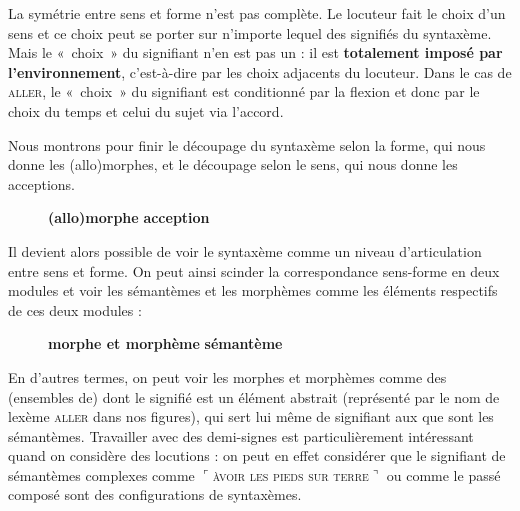 La symétrie entre sens et forme n’est pas complète. Le locuteur fait le choix d’un sens et ce choix peut se porter sur n’importe lequel des signifiés du syntaxème. Mais le «~choix~» du signifiant n’en est pas un : il est \textbf{totalement imposé par l’environnement}, c’est-à-dire par les choix adjacents du locuteur. Dans le cas de \textsc{aller}, le «~choix~» du signifiant est conditionné par la flexion et donc par le choix du temps et celui du sujet via l’accord.

Nous montrons pour finir le découpage du syntaxème selon la forme, qui nous donne les (allo)morphes, et le découpage selon le sens, qui nous donne les acceptions.

\begin{figure}

           \textbf{(allo)morphe}             \textbf{acception}

\caption{\label{fig:}}
\end{figure}

Il devient alors possible de voir le syntaxème comme un niveau d’articulation entre sens et forme. On peut ainsi scinder la correspondance sens-forme en deux modules et voir les sémantèmes et les morphèmes comme les éléments respectifs de ces deux modules :

\begin{figure}

    \textbf{morphe et morphème}         \textbf{sémantème}

\caption{\label{fig:}}
\end{figure}

En d’autres termes, on peut voir les morphes et morphèmes comme des (ensembles de)  dont le signifié est un élément abstrait (représenté par le nom de lexème \textsc{aller} dans nos figures), qui sert lui même de signifiant aux  que sont les sémantèmes. Travailler avec des demi-signes est particulièrement intéressant quand on considère des locutions : on peut en effet considérer que le signifiant de sémantèmes complexes comme $⌜$\textsc{àvoir} \textsc{les} \textsc{pieds} \textsc{sur} \textsc{terre}$⌝$ ou comme le passé composé sont des configurations de syntaxèmes.

